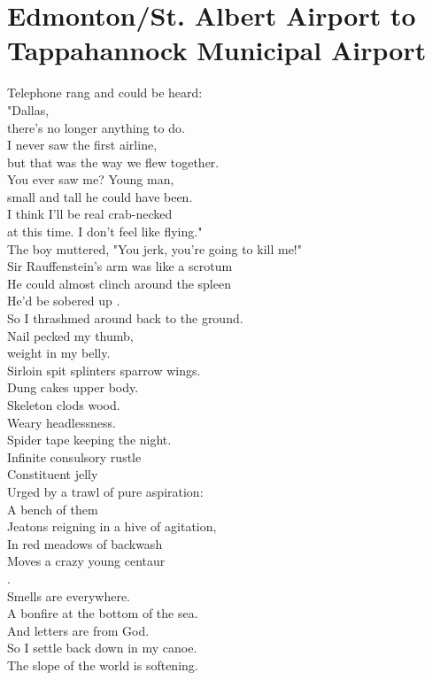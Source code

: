 \documentclass[smalldemyvopaper,11pt,twoside,onecolumn,openright,extrafontsizes]{memoir}
\begin{document}
\chapter{Edmonton/St. Albert Airport to Tappahannock Municipal Airport}
Telephone rang and could be heard:
\\"Dallas,
\\there's no longer anything to do.
\\I never saw the first airline,
\\but that was the way we flew together.
\\You ever saw me? Young man,
\\small and tall he could have been.
\\I think I'll be real crab-necked
\\at this time. I don't feel like flying."
\\The boy muttered, "You jerk, you're going to kill me!"
\\Sir Rauffenstein's arm was like a scrotum
\\He could almost clinch around the spleen
\\He'd be sobered up         .
\\So I thrashmed around back to the ground.
\\Nail pecked my thumb,
\\weight in my belly.
\\Sirloin spit splinters sparrow wings.
\\Dung cakes upper body.
\\Skeleton clods wood.
\\Weary headlessness.
\\Spider tape keeping the night.
\\Infinite consulsory rustle
\\Constituent jelly
\\Urged by a trawl of pure aspiration:
\\A bench of them
\\Jeatons reigning in a hive of agitation,
\\In red meadows of backwash
\\Moves a crazy young centaur
\\.
\\Smells are everywhere.
\\A bonfire at the bottom of the sea.
\\And letters are from God.
\\So I settle back down in my canoe.
\\The slope of the world is softening.
\end{document}
